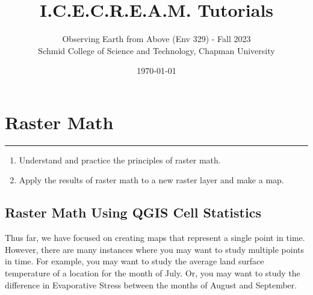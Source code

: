 \documentclass[oneside,a4paper,11pt,explicit]{book}
\title{I.C.E.C.R.E.A.M. Tutorials}
\subtitle{\small Observing Earth from Above (Env 329) - Fall 2023  \\
	\small Schmid College of Science and Technology, Chapman University}
\date{\today}
\begin{document}
\setcounter{tocdepth}{3}
\setcounter{minitocdepth}{3}
\dominitoc

\setcounter{chapter}{9} %

\chapter{Raster Math} %

\vspace{-2em}

\minitoc

\hrule

\vspace{1em}

\begin{tcolorbox}[enhanced,frame style image=blueshade.png,
	opacityback=0.75,opacitybacktitle=0.25,
	colback=blue!5!white,colframe=blue!75!black,title={\Large \textbf{Objectives:}}]
	\large
	\begin{enumerate}
		\item Understand and practice the principles of raster math. 
		\item Apply the results of raster math to a new raster layer and make a map.
	\end{enumerate}
\end{tcolorbox}

\clearpage

\fancyhead{}

\section{Raster Math Using QGIS Cell Statistics}

Thus far, we have focused on creating maps that represent a single point in time. However, there are many instances where you may want to study multiple points in time. For example, you may want to study the average land surface temperature of a location for the month of July. Or, you may want to study the difference in Evaporative Stress between the months of August and September. 
\end{document}
